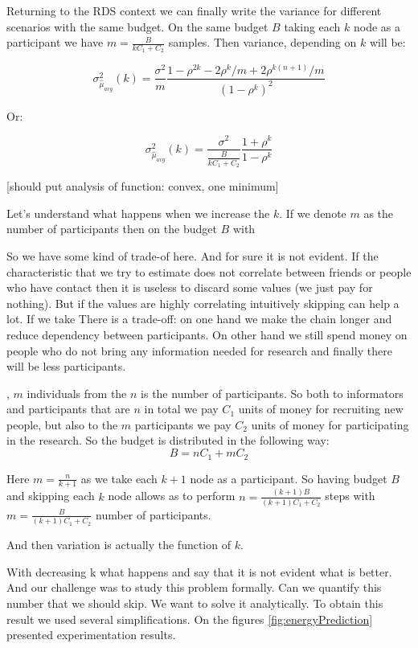 \documentclass[12pt]{report}
\begin{document}
Returning to the RDS context we can finally write the variance for different scenarios with the same budget. On the same budget $B$ taking each $k$ node as a participant we have $m = \frac{B}{kC_1 + C_2}$ samples. Then variance, depending on $k$ will be:

$$ \sigma^2_{\hat{\mu}_{avg}} (k) = \frac{\sigma^2}{m}\frac{1-\rho^{2k} - 2\rho^k/m + 2\rho^{k(n+1)}/m}{(1-\rho^k)^2}$$

Or:

$$ \sigma^2_{\hat{\mu}_{avg}} (k) = \frac{\sigma^2}{\frac{B}{kC_1 + C_2}} \frac{1+\rho^k}{1-\rho^k}$$

[should put analysis of function: convex, one minimum]

Let's understand what happens when we increase the $k$. If we denote $m$ as the number of participants then on the budget $B$ with 



So we have some kind of trade-of here. And for sure it is not evident. If the characteristic that we try to estimate does not correlate between friends or people who have contact then it is useless to discard some values (we just pay for nothing). But if the values are highly correlating intuitively skipping can help a lot.
If we take There is a trade-off: on one hand we make the chain longer and reduce dependency between participants. On other hand we still spend money on people who do not bring any information needed for research and finally there will be less participants. 

, $m$ individuals from the $n$ is the number of participants. 
So both to informators and participants that are $n$ in total we pay $C_1$ units of money for recruiting new people, but also to the $m$ participants we pay $C_2$ units of money for participating in the research. So the budget is distributed in the following way: 
$$B = nC_1 + mC_2$$


Here $m = \frac{n}{k+1}$ as we take each $k+1$ node as a participant. So having budget $B$ and skipping each $k$ node allows as to perform $n = \frac{(k+1)B}{(k+1)C_1 + C_2}$ steps with $m = \frac{B}{(k+1)C_1 + C_2}$ number of participants.


And then variation is actually the function of $k$.

With decreasing k what happens and say that it is not evident what is better.
And our challenge was to study this problem formally. Can we quantify this number that we should skip. We want to solve it analytically.
To obtain this result we used several simplifications. On the figures \ref{fig:energyPrediction} presented experimentation results.
\end{document}
